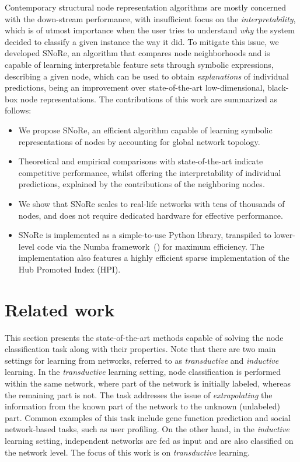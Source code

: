 \documentclass[twoside,11pt]{article}
\begin{document}
Contemporary structural node representation algorithms are mostly concerned with the down-stream performance, with insufficient focus on the \emph{interpretability}, which is of utmost importance when the user tries to understand \emph{why} the system decided to classify a given instance the way it did. To mitigate this issue, we developed SNoRe, an algorithm that compares node neighborhoods and is capable of learning interpretable feature sets through symbolic expressions, describing a given node, which can be used to obtain \emph{explanations} of individual predictions, being an improvement over state-of-the-art low-dimensional, black-box node representations.
The contributions of this work are summarized as follows:
\begin{itemize}
    \item We propose SNoRe, an efficient algorithm capable of learning symbolic representations of nodes by accounting for global network topology.
    \item Theoretical and empirical comparisons with state-of-the-art indicate competitive performance, whilst offering the interpretability of individual predictions, explained by the contributions of the neighboring nodes.
    \item We show that SNoRe scales to real-life networks with tens of thousands of nodes, and does not require dedicated hardware for effective performance.
    \item SNoRe is implemented as a simple-to-use Python library, transpiled to lower-level code via the Numba framework~(\cite{lam2015numba}) for maximum efficiency. The implementation also features a highly efficient sparse implementation of the Hub Promoted Index (HPI).
\end{itemize}

\section{Related work}
\label{sec:related}

This section presents the state-of-the-art methods capable of solving the node classification task along with their properties. Note that there are two main settings for learning from networks, referred to as  \emph{transductive} and \emph{inductive} learning. In the \emph{transductive} learning setting, node classification is performed within the same network, where part of the network is initially labeled, whereas the remaining part is not. The task addresses the issue of \emph{extrapolating} the information from the known part of the network to the unknown (unlabeled) part. Common examples of this task include gene function prediction and social network-based tasks, such as user profiling. On the other hand, in the \emph{inductive} learning setting, independent networks are fed as input and are also classified on the network level. The focus of this work is on \emph{transductive} learning.
\end{document}
